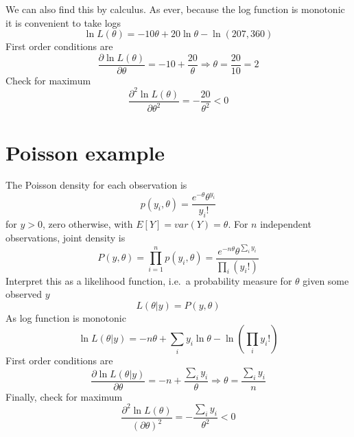 \documentclass[
  letterpaper,
]{book}
\begin{document}
We can also find this by calculus. As ever, because the log function is
monotonic it is convenient to take logs \begin{equation}
   \ln L(\theta) = -10\theta + 20\ln\theta -\ln(207,360)
\end{equation} First order conditions are \begin{equation}
  \frac{\partial \ln L(\theta )}{\partial\theta} = -10+\frac{20}{\theta}
\Rightarrow \theta =\frac{20}{10}=2
\end{equation} Check for maximum \begin{equation}
   \frac{\partial^2\ln L(\theta )}{\partial\theta^2} = -\frac{20}{\theta^2} < 0
\end{equation}

\hypertarget{poisson-example-1}{%
\section{Poisson example}\label{poisson-example-1}}

The Poisson density for each observation is \begin{equation}
   p(y_i, \theta) = \frac{e^{-\theta} \theta^{y_i}}{y_i!}
\end{equation} for \(y>0\), zero otherwise, with \(E[Y]=var(Y)=\theta\).
For \(n\) independent observations, joint density is \begin{equation}
P(y, \theta) = \prod_{i=1}^n p(y_i, \theta)
  = \frac{e^{-n\theta}\theta^{\sum_i y_i}}{\prod_i (y_i!)}
\end{equation} Interpret this as a likelihood function, i.e.~a
probability measure for \(\theta\) given some observed \(y\)
\begin{equation}
 L(\theta | y) = P(y,\theta)
\end{equation} As log function is monotonic \begin{equation}
\ln L(\theta | y) = -n\theta + {\textstyle{\sum_i} y_i} \ln\theta  - \ln\left(\textstyle{\prod_i} y_i! \right)
\end{equation} First order conditions are \begin{equation}
  \frac{\partial \ln L(\theta|y)}{\partial\theta}
     = -n + \frac{\sum_i y_i}{\theta}
     \Rightarrow
        \theta =\frac{\sum_i y_i}{n}
\end{equation} Finally, check for maximum \begin{equation}
 \frac{\partial^2\ln L(\theta)}{(\partial\theta)^2} = -\frac{\sum_i y_i}{\theta^2} < 0
\end{equation}
\end{document}
